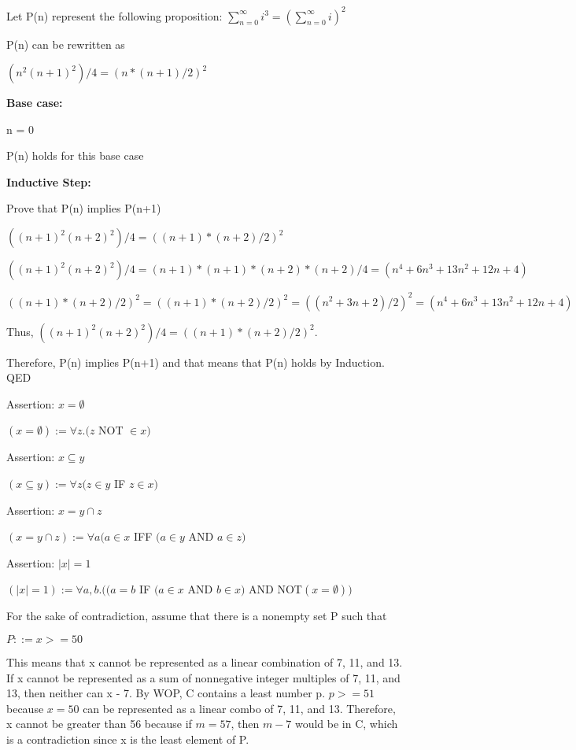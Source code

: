 \documentclass{6042}
\author{Ian Miller}
\begin{document}

Let P(n) represent the following proposition: $\sum_{n=0}^{\infty} {i^3} = (\sum_{n=0}^{\infty} {i})^2$ 

P(n) can be rewritten as 

$(n^2(n+1)^2)/4 = (n*(n+1)/2)^2$

\textbf{Base case:}

n = 0

P(n) holds for this base case

\textbf{Inductive Step:}

Prove that P(n) implies P(n+1)

$((n+1)^2(n+2)^2)/4 = ((n+1)*(n+2)/2)^2$

$((n+1)^2(n+2)^2)/4 = (n+1)*(n+1)*(n+2)*(n+2)/4 = (n^4 + 6n^3 + 13n^2 + 12n + 4)$

$((n+1)*(n+2)/2)^2 = ((n+1)*(n+2)/2)^2 = ((n^2 + 3n + 2)/2)^2 = (n^4 + 6n^3 + 13n^2 + 12n + 4)$

Thus, $((n+1)^2(n+2)^2)/4 = ((n+1)*(n+2)/2)^2$.

Therefore, P(n) implies P(n+1) and that means that P(n) holds by Induction. QED




Assertion: $x = \emptyset$

$(x = \emptyset) := \forall{z}.(z$ NOT $\in{x})$


Assertion: $x \subseteq{y}$

$(x \subseteq{y}) := \forall{z}(z \in{y}$ IF $z \in{x})$


Assertion: $x = y \cap{z}$

$(x = y \cap{z}) := \forall{a}(a \in{x}$ IFF $(a \in{y}$ AND $a \in{z})$


Assertion: $|x| = 1$

$(|x| = 1) := \forall{a, b}.((a = b$ IF $(a\in{x}$ AND $b\in{x})$ AND NOT$(x = \emptyset))$


For the sake of contradiction, assume that there is a nonempty set P such that 

$P ::= {x >= 50}$

This means that x cannot be represented as a linear combination of 7, 11, and 13. If x cannot be represented as a sum of nonnegative integer multiples of 7, 11, and 13, then neither can x - 7. 
By WOP, C contains a least number p. $p >= 51$ because $x = 50$ can be represented as a linear combo of 7, 11, and 13.
Therefore, x cannot be greater than 56 because if $m = 57$, then $m - 7$ would be in C, which is a contradiction since x is the least element of P.
\end{document}
